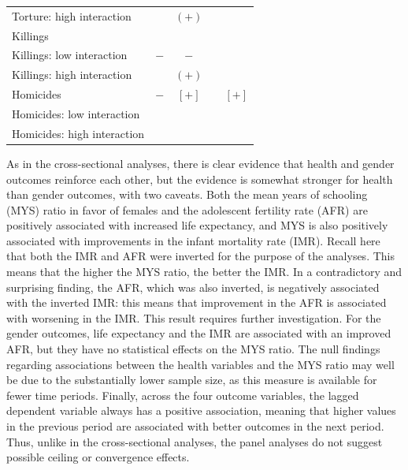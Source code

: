 \documentclass[12pt]{article}
\begin{document}
\begin{table}[!htbp]
\begin{tabular}{lc|c|c|c}
\qquad Torture: high interaction                  &       & $(+)$   &         & \\
Killings                                          &       &         &         & \\
\qquad Killings: low interaction                  & $-$   & $-$     &         & \\
\qquad Killings: high interaction                 &       & $(+)$   &         & \\
Homicides                                         & $-$   & $[+]$   &         & $[+]$ \\
\qquad Homicides: low interaction                 &       &         &         & \\
\qquad Homicides: high interaction                &       &         &         & \\
\bottomrule
\end{tabular}
\end{table}

As in the cross-sectional analyses, there is clear evidence that health and gender outcomes reinforce each other, but the evidence is somewhat stronger for health than gender outcomes, with two caveats.
Both the mean years of schooling (MYS) ratio in favor of females and the adolescent fertility rate (AFR) are positively associated with increased life expectancy, and MYS is also positively associated with improvements in the infant mortality rate (IMR).
Recall here that both the IMR and AFR were inverted for the purpose of the analyses.
This means that the higher the MYS ratio, the better the IMR.
In a contradictory and surprising finding, the AFR, which was also inverted, is negatively associated with the inverted IMR: this means that improvement in the AFR is associated with worsening in the IMR. This result requires further investigation.
For the gender outcomes, life expectancy and the IMR are associated with an improved AFR, but they have no statistical effects on the MYS ratio.
The null findings regarding associations between the health variables and the MYS ratio may well be due to the substantially lower sample size, as this measure is available for fewer time periods.
Finally, across the four outcome variables, the lagged dependent variable always has a positive association, meaning that higher values in the previous period are associated with better outcomes in the next period. Thus, unlike in the cross-sectional analyses, the panel analyses do not suggest possible ceiling or convergence effects.
\end{document}
